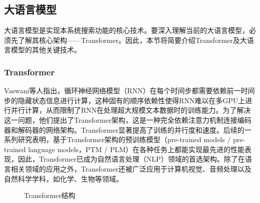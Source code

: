 \documentclass[UTF8,a4paper,12pt]{ctexart}
\numberwithin{equation}{section}
\begin{document}
\subsection{大语言模型}
大语言模型是实现本系统搜索功能的核心技术。要深入理解当前的大语言模型，必须先了解其核心架构——Transformer。因此，本节将简要介绍Transformer及大语言模型的其他关键技术。
\subsubsection{Transformer}
Vaswani等人指出，循环神经网络模型（RNN）在每个时间步都需要依赖前一时间步的隐藏状态信息进行计算，这种固有的顺序依赖性使得RNN难以在多GPU上进行并行计算，从而限制了RNN在处理超大规模文本数据时的训练能力。为了解决这一问题，他们提出了Transformer架构，这是一种完全依赖注意力机制连接编码器和解码器的网络架构。Transformer显著提高了训练的并行度和速度。后续的一系列研究表明，基于Transformer架构的预训练模型（pre-trained models / pre-trained language models，PTM / PLM）在各种任务上都能实现最先进的性能表现，因此，Transformer已成为自然语言处理（NLP）领域的首选架构。除了在语言相关领域的应用之外，Transformer还被广泛应用于计算机视觉、音频处理以及自然科学学科，如化学、生物等领域。\par
\begin{figure}[H] 
	\caption{Transformer结构}
	\label{transformer}
\end{figure} %
\end{document}
